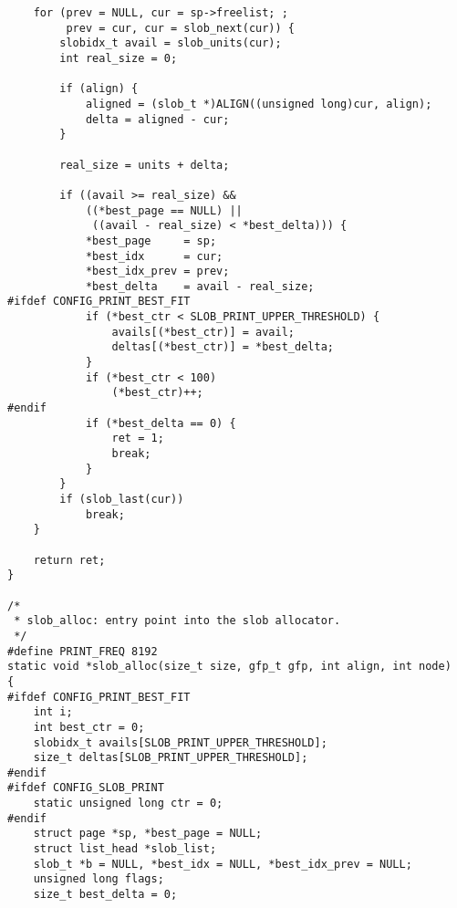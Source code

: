 \documentclass[letterpaper,10pt,titlepage,draftclsnofoot,onecolumn]{article}
\begin{document}
\begin{lstlisting}
	for (prev = NULL, cur = sp->freelist; ;
	     prev = cur, cur = slob_next(cur)) {
		slobidx_t avail = slob_units(cur);
		int real_size = 0;

		if (align) {
			aligned = (slob_t *)ALIGN((unsigned long)cur, align);
			delta = aligned - cur;
		}

		real_size = units + delta;

		if ((avail >= real_size) &&
		    ((*best_page == NULL) ||
		     ((avail - real_size) < *best_delta))) {
			*best_page     = sp;
			*best_idx      = cur;
			*best_idx_prev = prev;
			*best_delta    = avail - real_size;
#ifdef CONFIG_PRINT_BEST_FIT
			if (*best_ctr < SLOB_PRINT_UPPER_THRESHOLD) {
				avails[(*best_ctr)] = avail;
				deltas[(*best_ctr)] = *best_delta;
			}
			if (*best_ctr < 100)
				(*best_ctr)++;
#endif
			if (*best_delta == 0) {
				ret = 1;
				break;
			}
		}
		if (slob_last(cur))
			break;
	}

	return ret;
}

/*
 * slob_alloc: entry point into the slob allocator.
 */
#define PRINT_FREQ 8192
static void *slob_alloc(size_t size, gfp_t gfp, int align, int node)
{
#ifdef CONFIG_PRINT_BEST_FIT
	int i;
	int best_ctr = 0;
	slobidx_t avails[SLOB_PRINT_UPPER_THRESHOLD];
	size_t deltas[SLOB_PRINT_UPPER_THRESHOLD];
#endif
#ifdef CONFIG_SLOB_PRINT
	static unsigned long ctr = 0;
#endif
	struct page *sp, *best_page = NULL;
	struct list_head *slob_list;
	slob_t *b = NULL, *best_idx = NULL, *best_idx_prev = NULL;
	unsigned long flags;
	size_t best_delta = 0;


\end{lstlisting}
\end{document}
